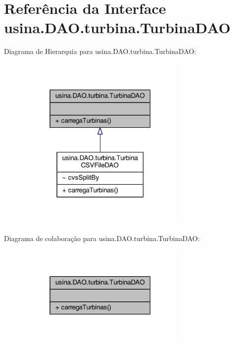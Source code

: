 \hypertarget{interfaceusina_1_1_d_a_o_1_1turbina_1_1_turbina_d_a_o}{\section{Referência da Interface usina.\-D\-A\-O.\-turbina.\-Turbina\-D\-A\-O}
\label{interfaceusina_1_1_d_a_o_1_1turbina_1_1_turbina_d_a_o}
}


Diagrama de Hierarquia para usina.\-D\-A\-O.\-turbina.\-Turbina\-D\-A\-O\-:\nopagebreak
\begin{figure}[H]
\begin{center}
\leavevmode
\includegraphics[width=232pt]{interfaceusina_1_1_d_a_o_1_1turbina_1_1_turbina_d_a_o__inherit__graph}
\end{center}
\end{figure}


Diagrama de colaboração para usina.\-D\-A\-O.\-turbina.\-Turbina\-D\-A\-O\-:\nopagebreak
\begin{figure}[H]
\begin{center}
\leavevmode
\includegraphics[width=232pt]{interfaceusina_1_1_d_a_o_1_1turbina_1_1_turbina_d_a_o__coll__graph}
\end{center}
\end{figure}
